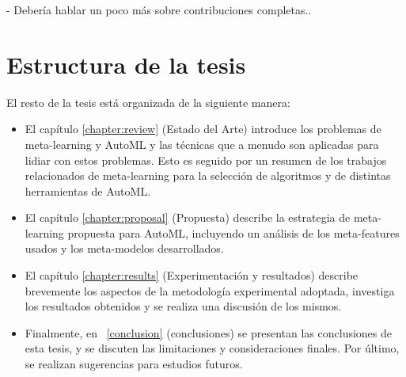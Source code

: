 - Debería hablar un poco más sobre contribuciones completas..

\section*{Estructura de la tesis}

El resto de la tesis está organizada de la siguiente manera:

\begin{itemize}
	\item El capítulo \ref{chapter:review} (Estado del Arte) introduce los problemas de meta-learning y AutoML y las técnicas que a menudo son aplicadas para lidiar con estos problemas. Esto es seguido por un resumen de los trabajos relacionados de meta-learning para la selección de algoritmos y de distintas herramientas de AutoML.
	\item El capítulo \ref{chapter:proposal} (Propuesta) describe la estrategia de meta-learning propuesta para AutoML, incluyendo un análisis de los meta-features usados y los meta-modelos desarrollados.
	\item El capítulo \ref{chapter:results} (Experimentación y resultados) describe brevemente los aspectos de la metodología experimental adoptada, investiga los resultados obtenidos y se realiza una discusión de los mismos.
	\item Finalmente, en ~\ref{conclusion} (conclusiones) se presentan las conclusiones de esta tesis, y se discuten las limitaciones y consideraciones finales. Por último, se realizan sugerencias para estudios futuros.
\end{itemize}